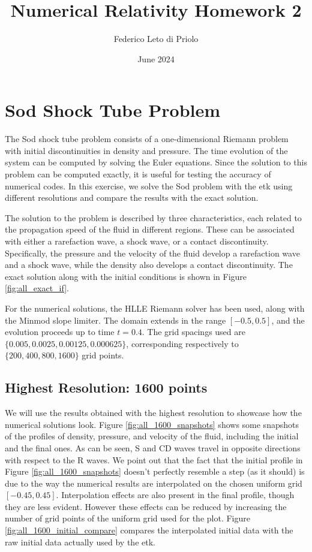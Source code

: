 \documentclass[11pt, a4paper]{article}
\title{Numerical Relativity Homework 2}
\author{Federico Leto di Priolo}
\date{June 2024}
\begin{document}
\maketitle

\section{Sod Shock Tube Problem}

The Sod shock tube problem consists of a one-dimensional Riemann problem with initial discontinuities in density and pressure. The time evolution of the system can be computed by solving the Euler equations. Since the solution to this problem can be computed exactly, it is useful
for testing the accuracy of numerical codes. In this exercise, we solve the Sod problem with the \acrfull{etk} using different resolutions and compare the results with the exact solution.

The solution to the problem is described by three characteristics, each related to the propagation speed of the fluid in different regions. These can be associated with either a rarefaction wave, a shock wave, or a contact discontinuity. Specifically, the pressure and the velocity of the fluid develop a rarefaction wave and a shock wave, while the density also develops a contact discontinuity. The exact solution along with the initial conditions is shown in Figure \ref{fig:all_exact_if}.

For the numerical solutions, the HLLE Riemann solver has been used, along with the Minmod slope limiter. The domain extends in the range
\([-0.5, 0.5]\), and the evolution proceeds up to time \(t = 0.4\). The grid spacings used are \(\{0.005, 0.0025, 0.00125, 0.000625\}\), corresponding respectively to \(\{200, 400, 800, 1600\}\) grid points.

\subsection{Highest Resolution: 1600 points} \label{sec:highres1600}

We will use the results obtained with the highest resolution to showcase how the numerical solutions look. Figure \ref{fig:all_1600_snapshots} shows some snapshots of the profiles of density, pressure, and velocity of the fluid, including the initial and the final ones. As can be seen, S and CD waves travel in opposite directions with respect to the R waves. We point out that the fact that the initial profile in Figure \ref{fig:all_1600_snapshots} doesn't perfectly resemble a step (as it should) is due to the way the numerical results are interpolated on the chosen uniform grid \([-0.45, 0.45]\). Interpolation effects are also present in the final profile, though they are less evident. However these effects can be reduced by increasing the number of grid points of the uniform grid used for the plot. Figure \ref{fig:all_1600_initial_compare} compares the interpolated initial data with the raw initial data actually used by the \acrshort{etk}. 
\end{document}
